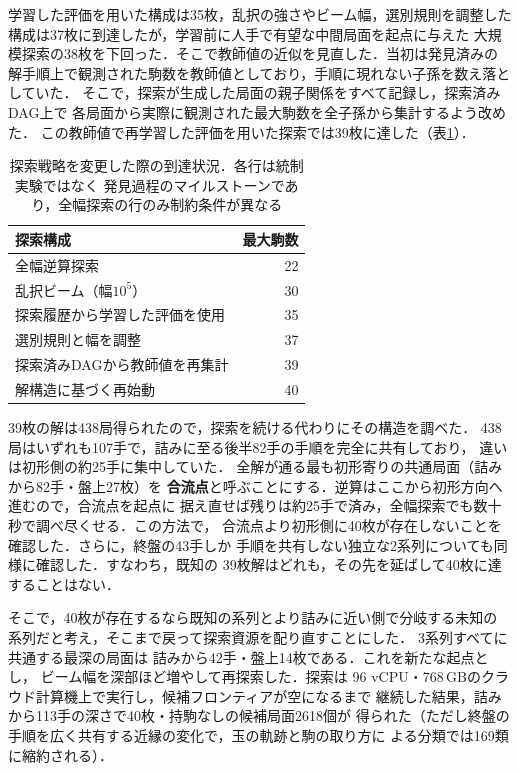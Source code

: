 \documentclass[10pt,a4paper,twocolumn]{ltjsarticle}
\begin{document}
学習した評価を用いた構成は35枚，乱択の強さやビーム幅，選別規則を調整した
構成は37枚に到達したが，学習前に人手で有望な中間局面を起点に与えた
大規模探索の38枚を下回った．そこで教師値の近似を見直した．当初は発見済みの
解手順上で観測された駒数を教師値としており，手順に現れない子孫を数え落としていた．
そこで，探索が生成した局面の親子関係をすべて記録し，探索済みDAG上で
各局面から実際に観測された最大駒数を全子孫から集計するよう改めた．
この教師値で再学習した評価を用いた探索では39枚に達した（表\ref{tab:results}）．

\begin{table}[t]
\centering
\caption{探索戦略を変更した際の到達状況．各行は統制実験ではなく
発見過程のマイルストーンであり，全幅探索の行のみ制約条件が異なる}
\label{tab:results}
\small
\begin{tabular}{lr}
\toprule
探索構成 & 最大駒数 \\
\midrule
全幅逆算探索 & 22 \\
乱択ビーム（幅$10^5$） & 30 \\
探索履歴から学習した評価を使用 & 35 \\
選別規則と幅を調整 & 37 \\
探索済みDAGから教師値を再集計 & 39 \\
解構造に基づく再始動 & 40 \\
\bottomrule
\end{tabular}
\end{table}

39枚の解は438局得られたので，探索を続ける代わりにその構造を調べた．
438局はいずれも107手で，詰みに至る後半82手の手順を完全に共有しており，
違いは初形側の約25手に集中していた．
全解が通る最も初形寄りの共通局面（詰みから82手・盤上27枚）を
\textbf{合流点}と呼ぶことにする．逆算はここから初形方向へ進むので，合流点を起点に
据え直せば残りは約25手で済み，全幅探索でも数十秒で調べ尽くせる．この方法で，
合流点より初形側に40枚が存在しないことを確認した．さらに，終盤の43手しか
手順を共有しない独立な2系列についても同様に確認した．すなわち，既知の
39枚解はどれも，その先を延ばして40枚に達することはない．

そこで，40枚が存在するなら既知の系列とより詰みに近い側で分岐する未知の
系列だと考え，そこまで戻って探索資源を配り直すことにした．
3系列すべてに共通する最深の局面は
詰みから42手・盤上14枚である．これを新たな起点とし，
ビーム幅を深部ほど増やして再探索した．探索は
96 vCPU・768\,GBのクラウド計算機上で実行し，候補フロンティアが空になるまで
継続した結果，詰みから113手の深さで40枚・持駒なしの候補局面2618個が
得られた（ただし終盤の手順を広く共有する近縁の変化で，玉の軌跡と駒の取り方に
よる分類では169類に縮約される）．
\end{document}
